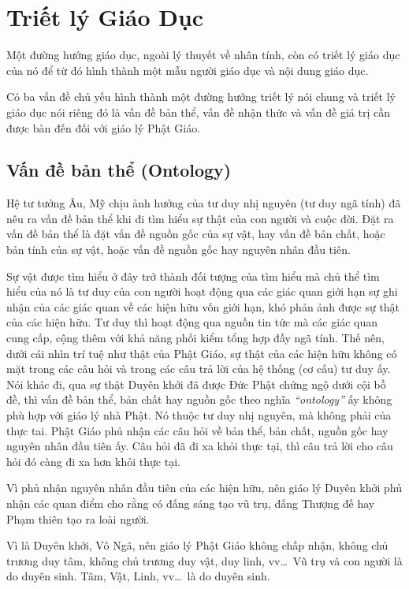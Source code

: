 \chapter{Triết lý Giáo Dục} %
\label{cha:triet_ly_giao_duc}

Một đường hướng giáo dục, ngoài lý thuyết về nhân tính, còn có triết lý giáo dục của nó để từ đó hình thành một mẫu người giáo dục và nội dung giáo dục.

Có ba vấn đề chủ yếu hình thành một đường hướng triết lý nói chung và triết lý giáo dục nói riêng đó là vấn đề bản thể, vấn đề nhận thức và vấn đề giá trị cần được bàn đến đối với giáo lý Phật Giáo.

\section{Vấn đề bản thể (Ontology)} %
\label{sec:van_de_ban_the}

Hệ tư tưởng Âu, Mỹ chịu ảnh hưởng của tư duy nhị nguyên (tư duy ngã tính) đã nêu ra vấn đề bản thể khi đi tìm hiểu sự thật của con người và cuộc đời. Đặt ra vấn đề bản thể là đặt vấn đề nguồn gốc của sự vật, hay vấn đề bản chất, hoặc bản tính của sự vật, hoặc vấn đề nguồn gốc hay nguyên nhân đầu tiên.

Sự vật được tìm hiểu ở đây trở thành đối tượng của tìm hiểu mà chủ thể tìm hiểu của nó là tư duy của con người hoạt động qua các giác quan giới hạn sự ghi nhận của các giác quan về các hiện hữu vốn giới hạn, khó phản ảnh được sự thật của các hiện hữu. Tư duy thì hoạt động qua nguồn tin tức mà các giác quan cung cấp, cộng thêm với khả năng phối kiểm tổng hợp đầy ngã tính. Thế nên, dưới cái nhìn trí tuệ như thật của Phật Giáo, sự thật của các hiện hữu không có mặt trong các câu hỏi và trong các câu trả lời của hệ thống (cơ cấu) tư duy ấy. Nói khác đi, qua sự thật Duyên khởi đã được Đức Phật chứng ngộ dưới cội bồ đề, thì vấn đề bản thể, bản chất hay nguồn gốc theo nghĩa \emph{``ontology''} ấy không phù hợp với giáo lý nhà Phật. Nó thuộc tư duy nhị nguyên, mà không phải của thực tai. Phật Giáo phủ nhận các câu hỏi về bản thể, bản chất, nguồn gốc hay nguyên nhân đầu tiên ấy. Câu hỏi đã đi xa khỏi thực tại, thì câu trả lời cho câu hỏi đó càng đi xa hơn khỏi thực tại.

Vì phủ nhận nguyên nhân đầu tiên của các hiện hữu, nên giáo lý Duyên khởi phủ nhận các quan điểm cho rằng có đấng sáng tạo vũ trụ, đấng Thượng đế hay Phạm thiên tạo ra loài người.

Vì là Duyên khởi, Vô Ngã, nên giáo lý Phật Giáo không chấp nhận, không chủ trương duy tâm, không chủ trương duy vật, duy linh, vv\ldots ~Vũ trụ và con người là do duyên sinh. Tâm, Vật, Linh, vv\ldots ~là do duyên sinh.

